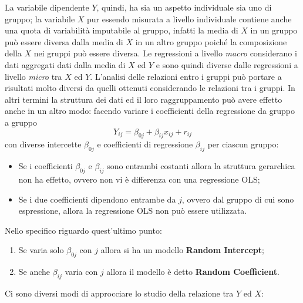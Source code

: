 \documentclass[a4page, 11pt]{article} %
\begin{document}
 La variabile dipendente $Y$, quindi, ha sia un aspetto individuale sia uno di gruppo; la variabile $X$ pur essendo misurata a livello individuale contiene anche una quota di variabilità imputabile al gruppo, infatti la media di $X$ in un gruppo può essere diversa dalla media di $X$ in un altro gruppo poiché la composizione della $X$ nei gruppi può essere diversa.
Le regressioni a livello \textit{macro} considerano i dati aggregati dati dalla media di $X$ ed $Y$ e sono quindi diverse dalle regressioni a livello \textit{micro} tra $X$ ed $Y$.
\newline
\newline
L’analisi delle relazioni entro i gruppi può portare a risultati molto diversi da quelli ottenuti considerando le relazioni tra i gruppi. In altri termini la struttura dei dati ed il loro raggruppamento può avere effetto anche in un altro modo: facendo variare i coefficienti della regressione da gruppo a gruppo
\begin{equation*}
Y_{ij} = \beta_{0j} + \beta_{ij} x_{ij} + r_{ij}
\end{equation*}
con diverse intercette $\beta_{0j}$ e coefficienti di regressione $\beta_{ij}$ per ciascun gruppo:
\begin{itemize}	
\item Se i coefficienti $\beta_{0j}$ e $\beta_{ij}$ sono entrambi costanti allora la struttura
gerarchica non ha effetto, ovvero non vi è differenza con una regressione OLS;
\item Se i due coefficienti dipendono entrambe da $j$, ovvero dal gruppo di cui sono espressione, allora la regressione OLS
non può essere utilizzata.
\end{itemize}
Nello specifico riguardo quest'ultimo punto:
	\begin{enumerate}
	\item Se varia solo $\beta_{0j}$ con $j$ allora si ha un modello \textbf{Random Intercept};
 	\item Se anche $\beta_{ij}$ varia con $j$ allora il modello è detto \textbf{Random Coefficient}.
	\end{enumerate}
Ci sono diversi modi di approcciare lo studio della relazione tra $Y$ ed $X$:
\end{document}
